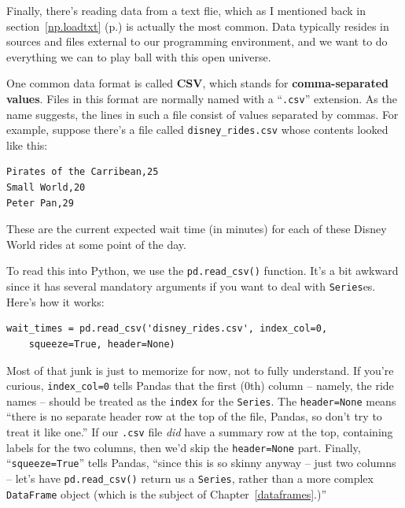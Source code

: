 Finally, there's reading data from a text flie, which as I mentioned back in
section~\ref{np.loadtxt} (p.\pageref{np.loadtxt}) is actually the most common. 
Data typically resides in sources and files external to our programming
environment, and we want to do everything we can to play ball with this open
universe.


One common data format is called \textbf{CSV}, which stands for
\textbf{comma-separated values}. Files in this format are normally named with a
``\texttt{.csv}'' extension. As the name suggests, the lines in such a file
consist of values separated by commas. For example, suppose there's a file
called \texttt{disney\_rides.csv} whose contents looked like this:

\begin{Verbatim}[fontsize=\small,samepage=true,frame=lines,framesep=2mm]
Pirates of the Carribean,25
Small World,20
Peter Pan,29
\end{Verbatim}

These are the current expected wait time (in minutes) for each of these Disney
World rides at some point of the day.

\label{read_csv}

To read this into Python, we use the \texttt{pd.read\_csv()} function. It's a
bit awkward since it has several mandatory arguments if you want to deal with
\texttt{Series}es. Here's how it works:

\begin{Verbatim}[fontsize=\small,samepage=true,frame=single,framesep=3mm]
wait_times = pd.read_csv('disney_rides.csv', index_col=0,
    squeeze=True, header=None)
\end{Verbatim}


Most of that junk is just to memorize for now, not to fully understand. If
you're curious, \texttt{index\_col=0} tells Pandas that the first (0th) column
-- namely, the ride names -- should be treated as the \texttt{index} for the
\texttt{Series}. The \texttt{header=None} means ``there is no separate header
row at the top of the file, Pandas, so don't try to treat it like one.'' If our
\texttt{.csv} file \textit{did} have a summary row at the top, containing
labels for the two columns, then we'd skip the \texttt{header=None} part.
Finally, ``\texttt{squeeze=True}'' tells Pandas, ``since this is so skinny
anyway -- just two columns -- let's have \texttt{pd.read\_csv()} return us a
\texttt{Series}, rather than a more complex \texttt{DataFrame} object (which is
the subject of Chapter~\ref{dataframes}.)''
